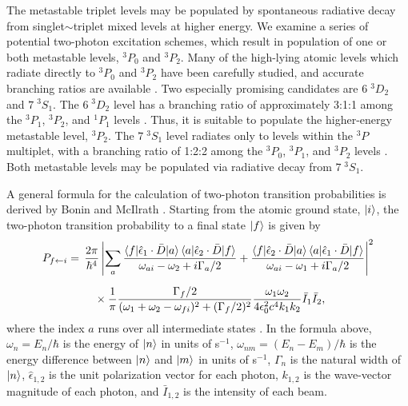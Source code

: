 \documentclass[12pt]{mitthesis}
\begin{document}
The metastable triplet levels may be populated by spontaneous
radiative decay from singlet$\sim$triplet mixed levels at higher
energy.  We examine a series of potential two-photon excitation
schemes, which result in population of one or both metastable levels,
$^3P_0$ and $^3P_2$.  Many of the high-lying atomic levels which
radiate directly to $^3P_0$ and $^3P_2$ have been carefully studied,
and accurate branching ratios are available \cite{benck89}.  Two
especially promising candidates are $6 \; ^3D_2$ and $7 \; ^3S_1$.
The $6 \; ^3D_2$ level has a branching ratio of approximately 3:1:1
among the $^3P_1$, $^3P_2$, and $^1P_1$ levels \cite{benck89}.  Thus,
it is suitable to populate the higher-energy metastable level,
$^3P_2$.  The $7 \; ^3S_1$ level radiates only to levels within the
$^3P$ multiplet, with a branching ratio of 1:2:2 among the $^3P_0$,
$^3P_1$, and $^3P_2$ levels \cite{benck89}.  Both metastable levels
may be populated via radiative decay from $7 \; ^3S_1$.

A general formula for the calculation of two-photon transition
probabilities is derived by Bonin and McIlrath \cite{bonin84}.
Starting from the atomic ground state, $\mathinner{|{i}\rangle}$, the two-photon
transition probability to a final state $\mathinner{|{f}\rangle}$ is given by
\begin{equation}
  \label{eq:tpa-prob}
  \begin{split}
    P_{f \leftarrow i} = &\: \: \frac{2 \pi}{\hbar^4}
    \left \lvert
      \sum_a
      \frac{
        \mathinner{\langle{f|\hat{\epsilon}_1 \cdot \bar{D}|a}\rangle}\mathinner{\langle{a|\hat{\epsilon}_2 \cdot \bar{D}|f}\rangle}
      }{
        \omega_{ai} - \omega_2 + i \Gamma_a / 2
      } + \frac{
        \mathinner{\langle{f|\hat{\epsilon}_2 \cdot \bar{D}|a}\rangle}\mathinner{\langle{a|\hat{\epsilon}_1 \cdot \bar{D}|f}\rangle}
      }{
        \omega_{ai} - \omega_1 + i \Gamma_a / 2
      }
    \right \rvert ^2\\[2mm]
    & \: \: \: \: \: \: \times 
      \frac{1}{\pi} 
      \frac{
        \Gamma_f / 2
      }{
        (\omega_1 + \omega_2 - \omega_{fi})^2+(\Gamma_f/2)^2
      } \frac{
        \omega_1 \omega_2
      }{
        4 \epsilon_0^2 c^4 k_1 k_2
      } \bar{I}_1 \bar{I}_2,\\
  \end{split}
\end{equation}
where the index $a$ runs over all intermediate states \cite{bonin84,
  grynberg77}.  In the formula above, $\omega_n = E_n / \hbar$ is the
energy of $\mathinner{|{n}\rangle}$ in units of s$^{-1}$, $\omega_{nm} = (E_n -
E_m)/\hbar$ is the energy difference between $\mathinner{|{n}\rangle}$ and $\mathinner{|{m}\rangle}$
in units of s$^{-1}$, $\Gamma_n$ is the natural width of $\mathinner{|{n}\rangle}$,
$\hat{\epsilon}_{1,2}$ is the unit polarization vector for each
photon, $k_{1,2}$ is the wave-vector magnitude of each photon, and
$\bar{I}_{1,2}$ is the intensity of each beam.
\end{document}
